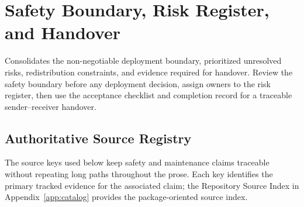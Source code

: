 \chapter{Safety Boundary, Risk Register, and Handover}
\label{ch:handover}

\chapteroverview
  {Consolidates the non-negotiable deployment boundary, prioritized unresolved
   risks, redistribution constraints, and evidence required for handover.}
  {Review the safety boundary before any deployment decision, assign owners to
   the risk register, then use the acceptance checklist and completion record
   for a traceable sender--receiver handover.}

\section{Authoritative Source Registry}

The source keys used below keep safety and maintenance claims traceable without
repeating long paths throughout the prose. Each key identifies the primary
tracked evidence for the associated claim; the Repository Source Index in
Appendix~\ref{app:catalog} provides the package-oriented source index.

